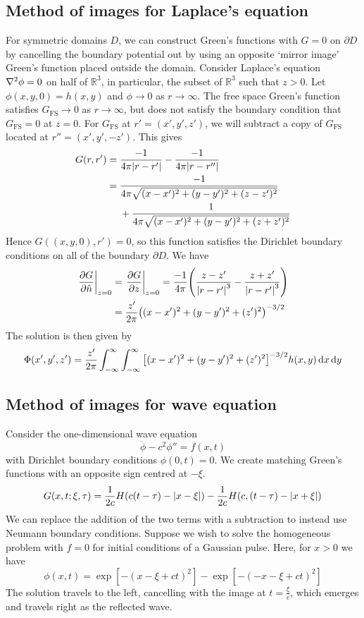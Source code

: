 \documentclass[a4paper]{article}
\begin{document}
\subsection{Method of images for Laplace's equation}
For symmetric domains \( D \), we can construct Green's functions with \( G = 0 \) on \( \partial D \) by cancelling the boundary potential out by using an opposite `mirror image' Green's function placed outside the domain.
Consider Laplace's equation \( \laplacian{\phi} = 0 \) on half of \( \mathbb R^3 \), in particular, the subset of \( \mathbb R^3 \) such that \( z > 0 \).
Let \( \phi(x,y,0) = h(x,y) \) and \( \phi \to 0 \) as \( r \to \infty \).
The free space Green's function satisfies \( G_{\mathrm{FS}} \to 0 \) as \( r \to \infty \), but does not satisfy the boundary condition that \( G_{\mathrm{FS}} = 0 \) at \( z = 0 \).
For \( G_{\mathrm{FS}} \) at \( r' = (x',y',z') \), we will subtract a copy of \( G_{\mathrm{FS}} \) located at \( r'' = (x',y',-z') \).
This gives
\begin{align*}
	G(r,r') & = \frac{-1}{4\pi \abs{r - r'}} - \frac{-1}{4\pi \abs{r - r''}}                                                 \\
	        & = \frac{-1}{4\pi \sqrt{(x-x')^2 + (y-y')^2 + (z-z')^2}} \\ 
			&\ \ \ \ + \frac{1}{4\pi \sqrt{(x-x')^2 + (y-y')^2 + (z+z')^2}}
\end{align*}
Hence \( G((x,y,0), r') = 0 \), so this function satisfies the Dirichlet boundary conditions on all of the boundary \( \partial D \).
We have
\begin{align*}
	\eval{\pdv{G}{\hat n}}_{z = 0} &= \eval{\pdv{G}{z}}_{z = 0} = \frac{-1}{4\pi} \qty(\frac{z - z'}{\abs{r - r'}^3} - \frac{z + z'}{\abs{r-r'}^3}) \\&= \frac{z'}{2\pi} \qty((x-x')^2 + (y-y')^2 + (z')^2)^{-3/2}
\end{align*}
The solution is then given by
\[
	\Phi(x',y',z') = \frac{z'}{2\pi} \int_{-\infty}^\infty \int_{-\infty}^\infty \qty[ (x - x')^2 + (y-y')^2 + (z')^2 ]^{-3/2} h(x,y) \dd{x}\dd{y}
\]

\subsection{Method of images for wave equation}
Consider the one-dimensional wave equation
\[
	\ddot \phi - c^2 \phi'' = f(x,t)
\]
with Dirichlet boundary conditions \( \phi(0,t) = 0 \).
We create matching Green's functions with an opposite sign centred at \( -\xi \).
\[
	G(x,t;\xi,\tau) = \frac{1}{2c} H(c(t-\tau) - \abs{x-\xi}) - \frac{1}{2c} H(c,(t-\tau) - \abs{x+\xi})
\]
We can replace the addition of the two terms with a subtraction to instead use Neumann boundary conditions.
Suppose we wish to solve the homogeneous problem with \( f = 0 \) for initial conditions of a Gaussian pulse.
Here, for \( x > 0 \) we have
\[
	\phi(x,t) = \exp[-(x-\xi + ct)^2] - \exp[-(-x - \xi + ct)^2]
\]
The solution travels to the left, cancelling with the image at \( t = \frac{\xi}{c} \), which emerges and travels right as the reflected wave.
\end{document}

